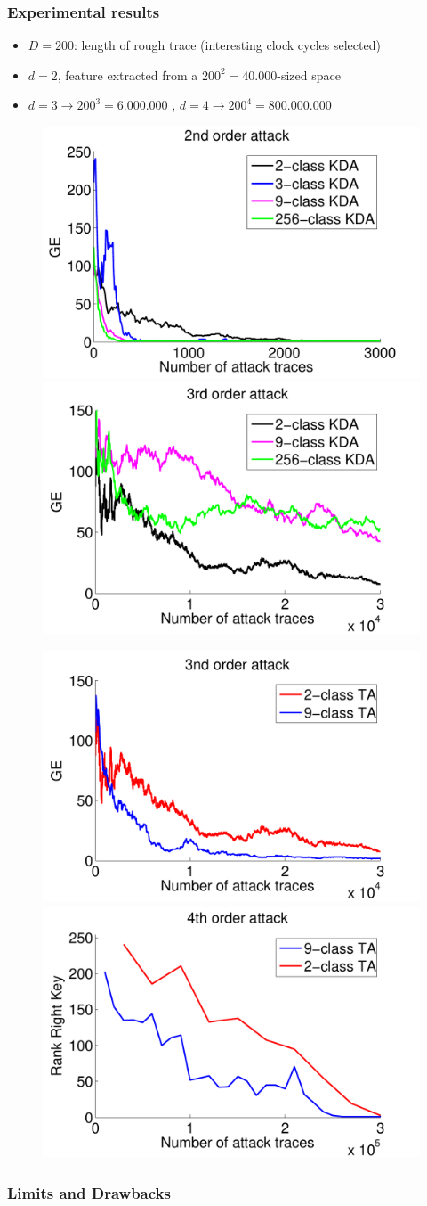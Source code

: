 \begin{frame}
\frametitle{Experimental results}
\begin{itemize}
\item $D = 200$: length of rough trace (interesting clock cycles selected)
\item $d=2$, feature extracted from a $200^2 = 40.000$-sized space
\item $d=3 \rightarrow 200^3=6.000.000$ , $d=4 \rightarrow 200^4 = 800.000.000$
\end{itemize}
\begin{figure}[t]

\includegraphics[width=.4\textwidth]{../Figures/CARDIS2016/2order_classes_TA.pdf}
\includegraphics[width=.4\textwidth]{../Figures/CARDIS2016/3order_new.pdf}
\end{figure}
\vspace{-10pt}
\begin{figure}[t]

\includegraphics[width=.4\textwidth]{../Figures/CARDIS2016/3order_2_9.pdf}
\includegraphics[width=.4\textwidth]{../Figures/CARDIS2016/4order_2_9.pdf}
\end{figure}
\end{frame}

\begin{frame}
\frametitle{Limits and Drawbacks}

\end{frame}